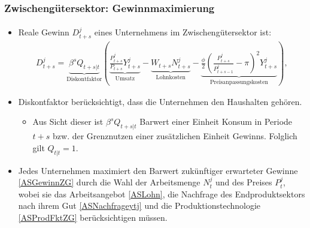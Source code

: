 \documentclass[10pt]{beamer}  %
\begin{document}
\begin{frame}
\frametitle{Zwischeng\"{u}tersektor: Gewinnmaximierung}\framesubtitle{}
\begin{itemize}
  \item Reale Gewinn $D_{t+s}^j$ eines Unternehmens im Zwischeng\"{u}tersektor ist:
\begin{eqnarray}\label{ASGewinnZG}
    D_{t+s}^j = \underbrace{\beta^s Q_{t+s|t}}_{\text{Diskontfaktor}} \left(\underbrace{\frac{P_{t+s}^j}{P_{t+s}} Y_{t+s}^j}_\text{Umsatz} - \underbrace{W_{t+s}N_{t+s}^j}_\text{Lohnkosten}-\underbrace{\frac{\phi}{2} \left(\frac{P_{t+s}^j}{P_{t+s-1}^j} - \pi \right)^2 Y_{t+s}^j}_\text{Preisanpassungskosten}\right),
\end{eqnarray}
\item Diskontfaktor ber\"{u}cksichtigt, dass die Unternehmen den Haushalten geh\"{o}ren.
\begin{itemize}
\item Aus Sicht dieser ist $\beta^s Q_{t+s|t}$ Barwert einer Einheit Konsum in Periode $t+s$ bzw. der Grenznutzen einer zus\"{a}tzlichen Einheit Gewinns. Folglich gilt $Q_{t|t}=1$.
\end{itemize}
\item Jedes Unternehmen maximiert den Barwert zuk\"{u}nftiger erwarteter Gewinne \eqref{ASGewinnZG} durch die Wahl der Arbeitsmenge $N_t^j$ und des Preises $P_t^j$, wobei sie das Arbeitsangebot \eqref{ASLohn}, die Nachfrage des Endproduktsektors nach ihrem Gut \eqref{ASNachfrageytj} und die Produktionstechnologie \eqref{ASProdFktZG} ber\"{u}cksichtigen m\"{u}ssen.
\end{itemize}
\end{frame}
\end{document}
